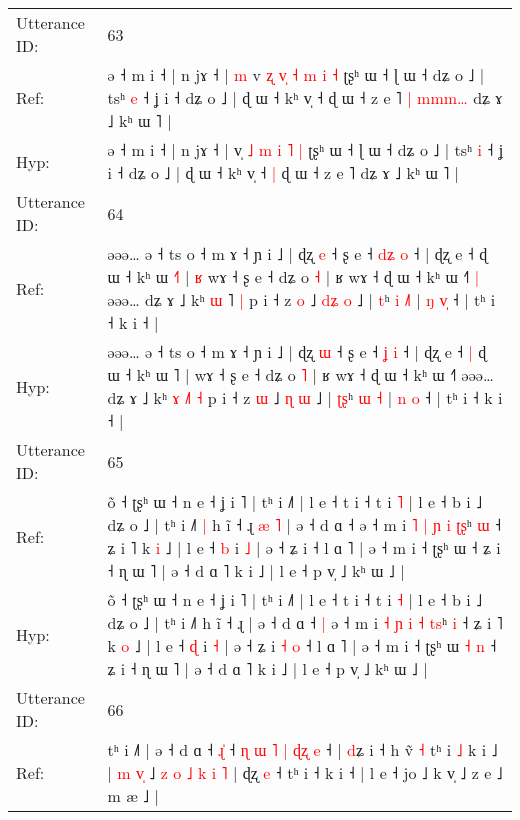 \documentclass[10pt]{article}
\DeclareRobustCommand{\hl}[1]{{\textcolor{red}{#1}}}
\begin{document}
\begin{longtable}{ll}
 \\
\midrule
Utterance ID: & 63 \\
Ref: & ə ˧ m i ˧ | n jɤ ˧ |\hl{ }\hl{m} v\hl{ }\hl{ʐ} \hl{v}\hl{̩} \hl{˧} \hl{m} \hl{i} \hl{˧} ʈʂʰ ɯ ˧ ɭ ɯ ˧ dʑ o ˩ | tsʰ \hl{e} ˧ ʝ i ˧ dʑ o ˩ | ɖ ɯ ˧ kʰ v̩ ˧\hl{}\hl{} ɖ ɯ ˧ z e ˥\hl{ }\hl{|}\hl{ }\hl{m}\hl{m}\hl{m}\hl{…} dʑ ɤ ˩ kʰ ɯ ˥ |
 \\
Hyp: & ə ˧ m i ˧ | n jɤ ˧ |\hl{}\hl{} v\hl{}\hl{̩} \hl{}\hl{˩} \hl{m} \hl{i} \hl{˥} \hl{|} ʈʂʰ ɯ ˧ ɭ ɯ ˧ dʑ o ˩ | tsʰ \hl{i} ˧ ʝ i ˧ dʑ o ˩ | ɖ ɯ ˧ kʰ v̩ ˧\hl{ }\hl{|} ɖ ɯ ˧ z e ˥\hl{}\hl{}\hl{}\hl{}\hl{}\hl{}\hl{} dʑ ɤ ˩ kʰ ɯ ˥ |
 \\
\midrule
Utterance ID: & 64 \\
Ref: & əəə… ə ˧ ts o ˧ m ɤ ˧ ɲ i ˩ | ɖʐ \hl{e} ˧ ʂ e ˧ \hl{d}\hl{ʑ} \hl{o} ˧ | ɖʐ e ˧\hl{}\hl{} ɖ ɯ ˧ kʰ ɯ \hl{˧}˥ |\hl{ }\hl{ʁ} wɤ ˧ ʂ e ˧ dʑ o \hl{˧} | ʁ wɤ ˧ ɖ ɯ ˧ kʰ ɯ ˧˥\hl{ }\hl{|} əəə… dʑ ɤ ˩ kʰ \hl{ɯ} \hl{}˥ \hl{|} p i ˧ z \hl{o} ˩ \hl{d}\hl{ʑ} \hl{o} ˩ | \hl{}\hl{t}ʰ \hl{i} \hl{˩}\hl{˥} | \hl{ŋ} \hl{v}\hl{̩} ˧ | tʰ i ˧ k i ˧ |
 \\
Hyp: & əəə… ə ˧ ts o ˧ m ɤ ˧ ɲ i ˩ | ɖʐ \hl{ɯ} ˧ ʂ e ˧ \hl{}\hl{ʝ} \hl{i} ˧ | ɖʐ e ˧\hl{ }\hl{|} ɖ ɯ ˧ kʰ ɯ \hl{}˥ |\hl{}\hl{} wɤ ˧ ʂ e ˧ dʑ o \hl{˥} | ʁ wɤ ˧ ɖ ɯ ˧ kʰ ɯ ˧˥\hl{}\hl{} əəə… dʑ ɤ ˩ kʰ \hl{ɤ} \hl{˩}˥ \hl{˧} p i ˧ z \hl{ɯ} ˩ \hl{}\hl{ɳ} \hl{ɯ} ˩ | \hl{ʈ}\hl{ʂ}ʰ \hl{ɯ} \hl{}\hl{˧} | \hl{n} \hl{}\hl{o} ˧ | tʰ i ˧ k i ˧ |
 \\
\midrule
Utterance ID: & 65 \\
Ref: & õ ˧ ʈʂʰ ɯ ˧ n e ˧ ʝ i ˥ | tʰ i ˩˥ | l e ˧ t i ˧ t i \hl{˥} | l e ˧ b i ˩ dʑ o ˩ | tʰ i ˩˥\hl{ }\hl{|} h ĩ ˧ ɻ\hl{ }\hl{æ}\hl{ }\hl{˥} | ə ˧ d ɑ ˧\hl{}\hl{} ə ˧ m i \hl{˥} \hl{|} \hl{ɲ} \hl{i} \hl{ʈ}\hl{ʂ}ʰ \hl{ɯ} ˧ ʑ i ˥ k \hl{i} ˩ | l e ˧ \hl{b} i \hl{˩} | ə ˧ ʑ i\hl{}\hl{}\hl{}\hl{} ˧ l ɑ ˥ | ə ˧ m i ˧ ʈʂʰ ɯ\hl{}\hl{}\hl{}\hl{} ˧ ʑ i ˧ ɳ ɯ ˥ | ə ˧ d ɑ ˥ k i ˩ | l e ˧ p v̩ ˩ kʰ ɯ ˩ |
 \\
Hyp: & õ ˧ ʈʂʰ ɯ ˧ n e ˧ ʝ i ˥ | tʰ i ˩˥ | l e ˧ t i ˧ t i \hl{˧} | l e ˧ b i ˩ dʑ o ˩ | tʰ i ˩˥\hl{}\hl{} h ĩ ˧ ɻ\hl{}\hl{}\hl{}\hl{} | ə ˧ d ɑ ˧\hl{ }\hl{|} ə ˧ m i \hl{˧} \hl{ɲ} \hl{i} \hl{˧} \hl{t}\hl{s}ʰ \hl{i} ˧ ʑ i ˥ k \hl{o} ˩ | l e ˧ \hl{ɖ} i \hl{˧} | ə ˧ ʑ i\hl{ }\hl{˧}\hl{ }\hl{o} ˧ l ɑ ˥ | ə ˧ m i ˧ ʈʂʰ ɯ\hl{ }\hl{˧}\hl{ }\hl{n} ˧ ʑ i ˧ ɳ ɯ ˥ | ə ˧ d ɑ ˥ k i ˩ | l e ˧ p v̩ ˩ kʰ ɯ ˩ |
 \\
\midrule
Utterance ID: & 66 \\
Ref: & tʰ i ˩˥ | ə ˧ d ɑ ˧ \hl{}\hl{ɻ}\hl{̍} ˧ \hl{ɳ} \hl{}\hl{ɯ} \hl{˥} \hl{|} \hl{ɖ}\hl{ʐ} \hl{e} ˧ | \hl{d}ʑ i ˧ h ṽ\hl{}\hl{}\hl{} \hl{˧} tʰ i \hl{˩} k i ˩ | \hl{m} \hl{v}\hl{̩} ˩\hl{ }\hl{z} \hl{o} \hl{˩} \hl{k} \hl{i} \hl{˥} | ɖʐ \hl{e} ˧\hl{}\hl{} tʰ i ˧ k i ˧ | l e ˧ jo ˩ k v̩ ˩ z e ˩ m æ ˩ |

\end{longtable}
\end{document}
